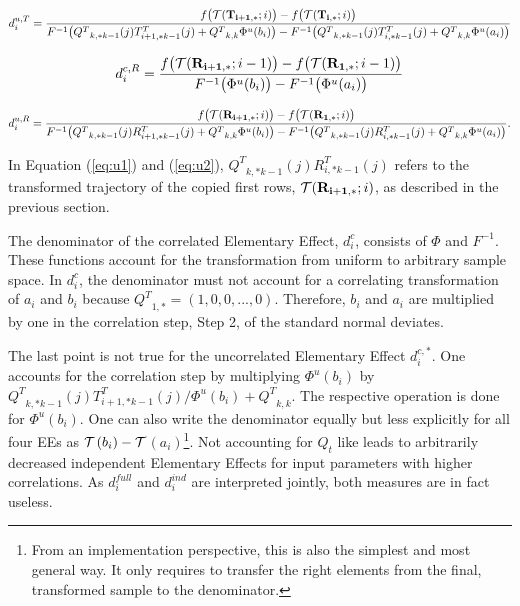 \documentclass[a4paper,12pt]{article}
\begin{document}
\begin{align} \label{eq:u1}
d_i^{u, T} = \frac{f\big(\mathcal{T}(\bold{T_{i+1,*}}; i)\big) - f\big(\mathcal{T}(\bold{T_{i,*}}; i)\big)}{F^{-1}\big({Q^T}_{k,*k-1}(j)T_{i+1,*k-1}^T(j) + {Q^T}_{k,k} \Phi^u(b_i)\big) - F^{-1}\big({Q^T}_{k,*k-1}(j)T_{i,*k-1}^T(j)+{Q^T}_{k,k} \Phi^u(a_i)\big)}
\end{align}

\begin{align}
d_i^{c, R} = \frac{f\big(\mathcal{T}(\bold{R_{i+1,*}}; i-1)\big) - f\big(\mathcal{T}(\bold{R_{1,*}}; i-1)\big)}{F^{-1}\big( \Phi^u(b_i)\big) - F^{-1}\big( \Phi^u(a_i)\big)}
\end{align}

\begin{align} \label{eq:u2}
d_i^{u, R} = \frac{f\big(\mathcal{T}(\bold{R_{i+1,*}}; i)\big) - f\big(\mathcal{T}(\bold{R_{1,*}}; i)\big)}{F^{-1}\big({Q^T}_{k,*k-1}(j)R_{i+1,*k-1}^T(j) + {Q^T}_{k,k} \Phi^u(b_i)\big) - F^{-1}\big({Q^T}_{k,*k-1}(j)R_{i,*k-1}^T(j)+{Q^T}_{k,k} \Phi^u(a_i)\big)}.
\end{align}

\noindent
In Equation (\ref{eq:u1}) and (\ref{eq:u2}), ${Q^T}_{k,*k-1}(j)R_{i,*k-1}^T(j)$ refers to the transformed trajectory of the copied first rows, $\mathcal{T}(\bold{R_{i+1,*}}; i)$, as described in the previous section.

The denominator of the correlated Elementary Effect, $d_i^{c}$, consists of $\Phi$ and $F^{-1}$. These functions account for the transformation from uniform to arbitrary sample space. In $d_i^{c}$, the denominator must not account for a correlating transformation of $a_i$ and $b_i$ because ${Q^T}_{1,*} = (1, 0, 0, ..., 0)$.  Therefore, $b_i$ and $a_i$ are multiplied by one in the correlation step, Step 2, of the standard normal deviates.

The last point is not true for the uncorrelated Elementary Effect $d_i^{c,*}$. One accounts for the correlation step by multiplying $\Phi^u(b_i)$ by ${Q^T}_{k,*k-1}(j)T_{i+1,*k-1}^T(j)/\Phi^u(b_i)+{Q^T}_{k,k}$. The respective operation is done for $\Phi^u(b_i)$. One can also write the denominator equally but less explicitly for all four EEs as $\cal{T}$$ (b_i) - \cal{T}$$ (a_i)$\footnote{From an implementation perspective, this is also the simplest and most general way. It only requires to transfer the right elements from the final, transformed sample to the denominator.}. Not accounting for $Q_t$ like \cite{ge2017extending} leads to arbitrarily decreased independent Elementary Effects for input parameters with higher correlations. As $d_i^{full}$ and $d_i^{ind}$ are interpreted jointly, both measures are in fact useless.
\end{document}
